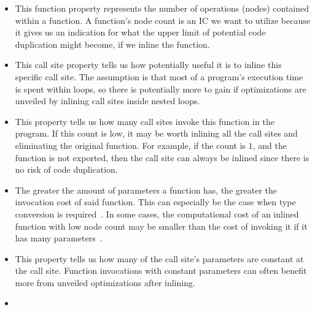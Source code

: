 \begin{itemize}

	\item {}

This function property represents the number of operations (nodes) contained
within a function. A function's node count is an IC we want to utilize because
it gives us an indication for what the upper limit of potential code duplication
might become, if we inline the function.

	\item {}

This call site property tells us how potentially useful it is to inline this
specific call site. The assumption is that most of a program's execution time is
spent within loops, so there is potentially more to gain if optimizations are
unveiled by inlining call sites inside nested loops.

	\item {}

This property tells us how many call sites invoke this function in the program.
If this count is low, it may be worth inlining all the call sites and
eliminating the original function. For example, if the count is $1$, and the
function is not exported, then the call site can always be inlined since there
is no risk of code duplication.

	\item {}

The greater the amount of parameters a function has, the greater the invocation
cost of said function. This can especially be the case when type conversion is
required~\cite{AdaptvCompilAndInlingWaterman}. In some cases, the computational
cost of an inlined function with low node count may be smaller than the cost of
invoking it if it has many parameters~\cite{AdaptvCompilAndInlingWaterman}.

	\item {}

This property tells us how many of the call site's parameters are constant at
the call site. Function invocations with constant parameters can often benefit
more from unveiled optimizations after inlining.

	\item {}


\end{itemize}
